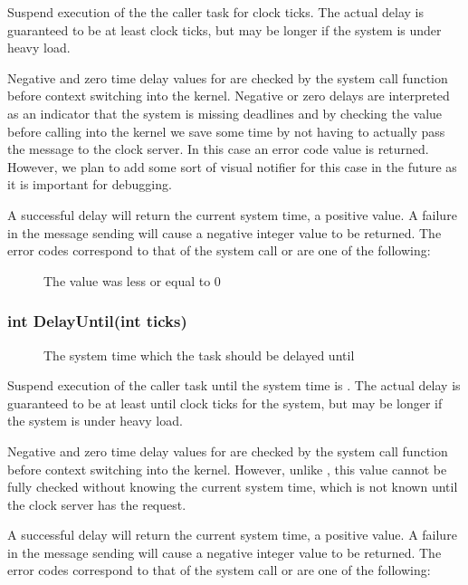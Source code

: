 \documentclass[pdftex,10pt,a4paper]{article}
\begin{document}
Suspend execution of the the caller task for  clock
ticks. The actual delay is guaranteed to be at least  clock
ticks, but may be longer if the system is under heavy load.

Negative and zero time delay values for  are checked by the
system call function before context switching into the
kernel. Negative or zero delays are interpreted as an indicator that
the system is missing deadlines and by checking the value before
calling into the kernel we save some time by not having to actually
pass the message to the clock server. In this case an error code value
is returned. However, we plan to add some sort of visual notifier
for this case in the future as it is important for debugging.

A successful delay will return the current system time, a positive
value. A failure in the message sending will cause a negative integer
value to be returned. The error codes correspond to that of the
 system call or are one of the following:

\begin{description}
\item[] The  value was less or
  equal to $0$
\end{description}


\subsubsection*{int DelayUntil(int ticks)}

\begin{description}
\item[] The system time which the task should be delayed
  until
\end{description}

Suspend execution of the caller task until the system time is .
The actual delay is guaranteed to be at least until 
clock ticks for the system, but may be longer if the system is under
heavy load.

Negative and zero time delay values for  are checked by the
system call function before context switching into the
kernel. However, unlike , this value cannot be fully
checked without knowing the current system time, which is not known
until the clock server has the request.

A successful delay will return the current system time, a positive
value. A failure in the message sending will cause a negative integer
value to be returned. The error codes correspond to that of the
 system call or are one of the following:
\end{document}
